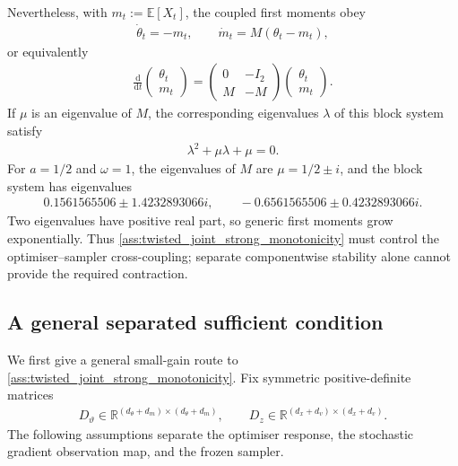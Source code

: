 Nevertheless, with $m_t:=\mathbb E[X_t]$, the coupled first moments obey
\begin{align*}
\dot\theta_t=-m_t,
\qquad
\dot m_t=M(\theta_t-m_t),
\end{align*}
or equivalently
\begin{align*}
\frac{\mathrm d}{\mathrm dt}
\begin{pmatrix}\theta_t\\m_t\end{pmatrix}
=
\begin{pmatrix}
0&-I_2\\
M&-M
\end{pmatrix}
\begin{pmatrix}\theta_t\\m_t\end{pmatrix}.
\end{align*}
If $\mu$ is an eigenvalue of $M$, the corresponding eigenvalues
$\lambda$ of this block system satisfy
\begin{align*}
\lambda^2+\mu\lambda+\mu=0.
\end{align*}
For $a=1/2$ and $\omega=1$, the eigenvalues of $M$ are
$\mu=1/2\pm i$, and the block system has eigenvalues
\begin{align*}
0.1561565506\pm1.4232893066i,
\qquad
-0.6561565506\pm0.4232893066i.
\end{align*}
Two eigenvalues have positive real part, so generic first moments grow
exponentially.  Thus \ref{ass:twisted_joint_strong_monotonicity} must control
the optimiser--sampler cross-coupling;
separate componentwise stability alone cannot provide the required
contraction.

\subsection{A general separated sufficient condition}
\label{app:separated_assumptions}

We first give a general small-gain route to
\ref{ass:twisted_joint_strong_monotonicity}.  Fix symmetric
positive-definite matrices
\begin{align*}
D_\vartheta\in
\mathbb R^{(d_\theta+d_m)\times(d_\theta+d_m)},
\qquad
D_z\in
\mathbb R^{(d_x+d_v)\times(d_x+d_v)}.
\end{align*}
The following assumptions separate the optimiser response, the stochastic
gradient observation map, and the frozen sampler.

